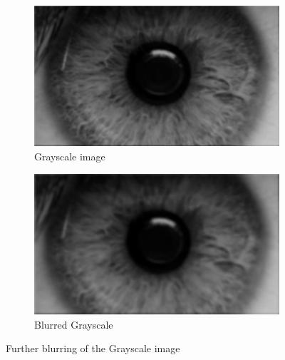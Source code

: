 \documentclass{article}
\begin{document}
%
%
\begin{figure}[H]
\centering

\begin{subfigure}{.5\textwidth}
  \centering
  \includegraphics[width=0.9\linewidth]{res/pupil/results/low_to_gray.jpg}
  \caption{Grayscale image}
  \label{fig:original_img}
\end{subfigure}%
\begin{subfigure}{.5\textwidth}
  \centering
  \includegraphics[width=0.9\linewidth]{res/pupil/results/gray_to_low.jpg}
  \caption{Blurred Grayscale}
  \label{fig:gray_img}
\end{subfigure}


\caption{Further blurring of the Grayscale image}
\label{fig:result_pup_gray_to_low}
\end{figure}
\end{document}
